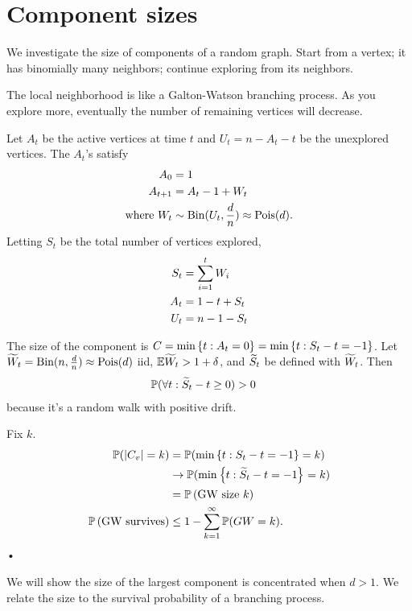 \section{Component sizes}

We investigate the size of components of a random graph. Start from a vertex; it has binomially many neighbors; continue exploring from its neighbors. 

The local neighborhood is like a Galton-Watson branching process. As you explore more, eventually the number of remaining vertices will decrease.

Let $A_t$ be the active vertices at time $t$ and $U_t = n-A_t-t$ be the unexplored vertices.
The $A_t$'s satisfy
\begin{align}
A_0&=1\\
A_{t+1} &= A_t-1+W_t\\
\text{where }W_t &\sim \text{Bin}(U_t,\frac{d}{n})\approx \text{Pois}(d).
\end{align}
Letting $S_t$ be the total number of vertices explored, %
\begin{align}
S_t &= \sum_{i=1}^{t} W_i\\
A_t &= 1-t+S_t\\
U_t&=n-1-S_t
\end{align}

The size of the component is $C = \min \left\{{t}:{A_t=0}\right\} = \min\left\{{t}:{S_t-t=-1}\right\}$.
Let $\widetilde{W}_t = \text{Bin}(n,\frac{d}{n})\approx \text{Pois}(d)$ iid, $\mathbb{E} \widetilde{W}_t>1+\delta$, and $\widetilde{S}_t$ be defined with $\widetilde{W}_t$.
 Then
\begin{align}
\mathbb{P}(\forall t: \widetilde{S}_t - t \ge 0) &>0
\end{align}
because it's a random walk with positive drift.

Fix $k$. 
\begin{align}
\Pj(|C_v|=k) &= \Pj(\min\set{t}{S_t-t=-1}=k)\\
&\to \Pj(\min\set{t}{\wt S_t - t=-1} = k)\\
&= \Pj\pat{GW size $k$}\\ %
\Pj\pat{GW survives}&\le 1-\sumo k{\iy} \Pj(GW=k).
\end{align}•

We will show the size of the largest component is concentrated when $d>1$. We relate the size to the survival probability of a branching process.


